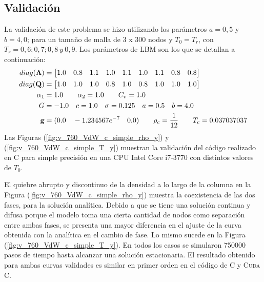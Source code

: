 \subsection{Validación}

La validación de este problema se hizo utilizando los parámetros $a =0,5$ y $b = 4,0$; para un tamaño de malla de 3 x 300 nodos y $T_0 = T_r$, con $T_r = 0,6 ; 0,7 ; 0,8 \> y \> 0,9$.  Los parámetros de LBM son los que se detallan a continuación:
\begin{align*}
\centering
diag(\mathbf{\Lambda}) & = 
\begin{bmatrix}
1.0 & 0.8 & 1.1 & 1.0 & 1.1 & 1.0 & 1.1 & 0.8 & 0.8 \\
\end{bmatrix}\\
diag(\mathbf{Q}) & = 
\begin{bmatrix}
1.0 & 1.0 & 1.0 & 0.8 & 1.0 & 0.8 & 1.0 & 1.0 & 1.0 \\
\end{bmatrix}\\
\alpha_{1} & = 1.0 \qquad 	\alpha_{2} = 1.0 \qquad C_{v} = 1.0\\
G & = -1.0 \quad c = 1.0 \quad \sigma = 0.125 \quad a = 0.5 \quad b = 4.0 \\
\mathbf{g} & = (0.0 \quad-1.234567e^{-7}\quad 0.0 ) \qquad \rho_c = \frac{1}{12} \qquad T_c = 0.037037037
\end{align*}
Las Figuras (\ref{fig:v_760_VdW_c_simple_rho_y}) y (\ref{fig:v_760_VdW_c_simple_T_y})  muestran la validación del código realizado en \textsc{C} para simple precisión en una CPU Intel Core i7-3770 con distintos valores de $T_0$. 

El quiebre abrupto y discontinuo de la densidad a lo largo de la columna en la Figura (\ref{fig:v_760_VdW_c_simple_rho_y}) muestra la coexistencia de las dos fases, para la solución analítica. Debido a que se tiene una solución continua y difusa porque el modelo toma una cierta cantidad de nodos como separación entre ambas fases, se presenta una mayor diferencia en el ajuste de la curva obtenida con la analítica en el cambio de fase. Lo mismo sucede en la Figura (\ref{fig:v_760_VdW_c_simple_T_y}). En todos los casos se simularon 750000 pasos de tiempo hasta alcanzar una solución estacionaria. El resultado obtenido para ambas curvas validades es similar en primer orden en el código de \textsc{C} y \textsc{Cuda C}.

